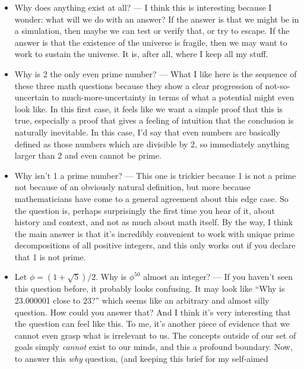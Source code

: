 \documentclass[11pt, oneside]{article}   	%
\begin{document}
\begin{itemize}
    \item Why does anything exist at all? --- I think this is interesting
        because I wonder: what will we do with an answer? If the answer is that
        we might be in a simulation, then maybe we can test or verify that, or
        try to escape. If the answer is that the existence of the universe is
        fragile, then we may want to work to sustain the universe. It is, after
        all, where I keep all my stuff.
    \item Why is 2 the only even prime number? --- What I like here is the
        sequence of these three math questions because they show a clear
        progression of not-so-uncertain to much-more-uncertainty in terms of
        what a potential might even look like. In this first case, it feels like
        we want a simple proof that this is true, especially a proof that gives
        a feeling of intuition that the conclusion is naturally inevitable. In
        this case, I'd say that even numbers are basically defined as those
        numbers which are divisible by 2, so immediately anything larger than 2
        and even cannot be prime.
    \item Why isn't 1 a prime number? --- This one is trickier because 1 is not
        a prime not because of an obviously natural definition, but more because
        mathematicians have come to a general agreement about this edge case. So
        the question is, perhaps surprisingly the first time you hear of it,
        about history and context, and not as much about math itself. By the
        way, I think the main answer is that it's incredibly convenient to work
        with unique prime decompositions of all positive integers, and this only
        works out if you declare that 1 is not prime.
    \item Let $\phi=(1+\sqrt 5)/2.$ Why is $\phi^{50}$ almost an integer? --- If
        you haven't seen this question before, it probably looks confusing.
        It may look like ``Why is 23.000001 close to 23?'' which seems like an
        arbitrary and almost silly question. How could you answer that? And I
        think it's very interesting that the question can feel like this. To me,
        it's another piece of evidence that we cannot even grasp what is
        irrelevant to us. The concepts outside of our set of goals simply {\em
        cannot} exist to our minds, and this a profound boundary. Now, to answer
        this {\em why} question, (and keeping this brief for my self-aimed

\end{itemize}
\end{document}
